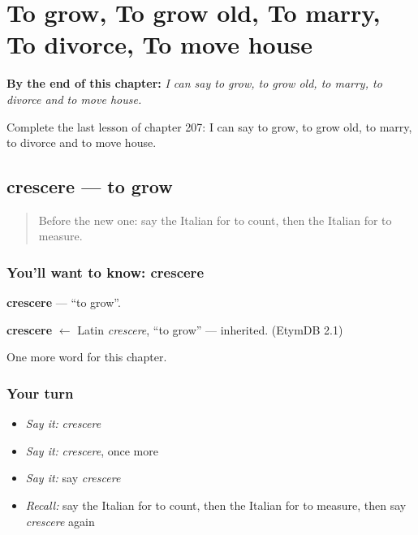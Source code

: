 
\chapter{To grow, To grow old, To marry, To divorce, To move house}
\label{ch:it-to-grow-to-grow-old-to-marry-to-divorce-to-move-house}

\begin{chapteropening}
\textbf{By the end of this chapter:} \emph{I can say to grow, to grow old, to marry, to divorce and to move house.}

Complete the last lesson of chapter 207: I can say to grow, to grow old, to marry, to divorce and to move house.
\end{chapteropening}

\section[crescere]{crescere — to grow}

\label{lesson:IT-C207-crescere}



\begin{quote}
Before the new one: say the Italian for to count, then the Italian for to measure.
\end{quote}

\subsection*{You'll want to know: crescere}
\textbf{crescere} — \textquotedblleft{}to grow\textquotedblright{}.

\begin{cousinweb}
\textbf{crescere} $\leftarrow$ Latin \emph{crescere}, \textquotedblleft{}to grow\textquotedblright{} — inherited. (EtymDB 2.1)
\end{cousinweb}

\begin{grammarlens}[title={What you've built}]
One more word for this chapter.
\end{grammarlens}

\subsection*{Your turn}
\begin{itemize}
\raggedright
  \item \emph{Say it:} \emph{crescere}
  \item \emph{Say it:} \emph{crescere}, once more
  \item \emph{Say it:} say \emph{crescere}
  \item \emph{Recall:} say the Italian for to count, then the Italian for to measure, then say \emph{crescere} again
\end{itemize}

